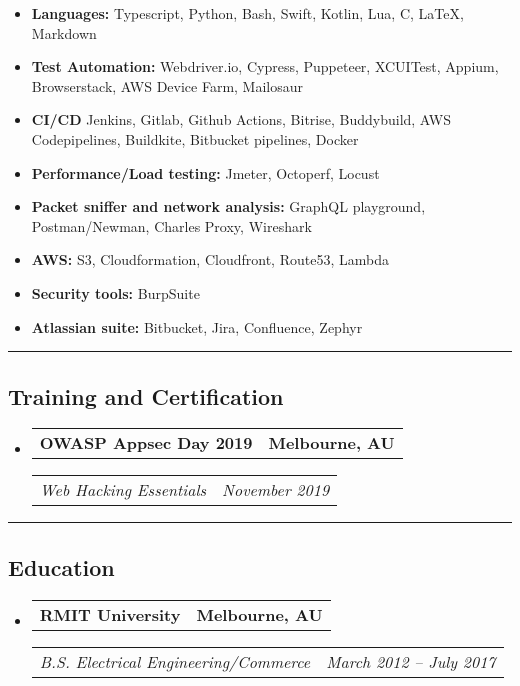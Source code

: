 \documentclass[11pt,letterpaper]{article}
\makeatletter
\newcommand{\headerrow}[2]
{\begin{tabular*}{\linewidth}{l@{\extracolsep{\fill}}r}
#1 &
#2 \\
\end{tabular*}}
\newcommand{\CPP}
{C\nolinebreak[4]\hspace{-.05em}\raisebox{.22ex}{\footnotesize\bf ++}}
\makeatother
\begin{document}
\begin{itemize}[leftmargin=1em,noitemsep]
	\item \textbf{Languages:}
	      Typescript, Python, Bash, Swift, Kotlin, Lua, \CPP, \LaTeX, Markdown
	\item \textbf{Test Automation:}
	    Webdriver.io, Cypress, Puppeteer, XCUITest, Appium, Browserstack, AWS Device Farm, Mailosaur
	\item \textbf{CI/CD} Jenkins, Gitlab, Github Actions, Bitrise, Buddybuild, AWS Codepipelines, Buildkite, Bitbucket pipelines, Docker
	\item \textbf{Performance/Load testing:} Jmeter, Octoperf, Locust 
    \item \textbf{Packet sniffer and network analysis:} GraphQL playground, Postman/Newman, Charles  Proxy, Wireshark
    \item \textbf{AWS:} S3, Cloudformation, Cloudfront, Route53, Lambda 
	\item \textbf{Security tools:} BurpSuite
    \item \textbf{Atlassian suite:} Bitbucket, Jira, Confluence, Zephyr
\end{itemize}

\hrule
\vspace{-1em}
\subsection*{\Large Training and Certification}

\begin{itemize}[leftmargin=1em]
	\parskip=0.1em
		
	\item
	      \headerrow
	      {\textbf{OWASP Appsec Day 2019}}
	      {\textbf{Melbourne, AU}}
	      \headerrow
	      {\emph{Web Hacking Essentials}}
	      {\emph{November 2019}}
	      	      
\end{itemize}

\hrule
\vspace{-1em}
\subsection*{\Large Education}

\begin{itemize}[leftmargin=1em]
	\parskip=0.1em
		
	\item
	      \headerrow
	      {\textbf{RMIT University}}
	      {\textbf{Melbourne, AU}}
	      \headerrow
	      {\emph{B.S. Electrical Engineering/Commerce}}
	      {\emph{March 2012 -- July 2017}}
	      	      
\end{itemize}
\end{document}
